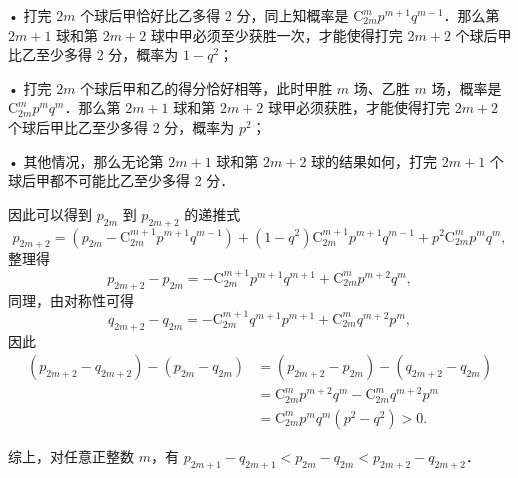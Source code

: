 \begin{solutions}
• 打完 $2m$ 个球后甲恰好比乙多得 2 分，同上知概率是 $\mathrm{C}_{2m}^mp^{m+1}q^{m-1}$．那么第 $2m+1$ 球和第 $2m+2$ 球中甲必须至少获胜一次，才能使得打完 $2m+2$ 个球后甲比乙至少多得 2 分，概率为 $1-q^2$；

• 打完 $2m$ 个球后甲和乙的得分恰好相等，此时甲胜 $m$ 场、乙胜 $m$ 场，概率是 $\mathrm{C}_{2m}^mp^mq^m$．那么第 $2m+1$ 球和第 $2m+2$ 球甲必须获胜，才能使得打完 $2m+2$ 个球后甲比乙至少多得 2 分，概率为 $p^2$；

• 其他情况，那么无论第 $2m+1$ 球和第 $2m+2$ 球的结果如何，打完 $2m+1$ 个球后甲都不可能比乙至少多得 2 分．

因此可以得到 $p_{2m}$ 到 $p_{2m+2}$ 的递推式
$$
p_{2m+2}=\left(p_{2m}-\mathrm{C}_{2m}^{m+1}p^{m+1}q^{m-1}\right)+(1-q^2)\mathrm{C}_{2m}^{m+1}p^{m+1}q^{m-1}+p^2\mathrm{C}_{2m}^mp^mq^m,
$$
整理得
$$
p_{2m+2}-p_{2m}=-\mathrm{C}_{2m}^{m+1}p^{m+1}q^{m+1}+\mathrm{C}_{2m}^mp^{m+2}q^m,
$$
同理，由对称性可得
$$
q_{2m+2}-q_{2m}=-\mathrm{C}_{2m}^{m+1}q^{m+1}p^{m+1}+\mathrm{C}_{2m}^mq^{m+2}p^m,
$$
因此
\begin{align*}
(p_{2m+2}-q_{2m+2})-(p_{2m}-q_{2m})&=(p_{2m+2}-p_{2m})-(q_{2m+2}-q_{2m})\\
&=\mathrm{C}_{2m}^mp^{m+2}q^m-\mathrm{C}_{2m}^mq^{m+2}p^m\\
&=\mathrm{C}_{2m}^mp^mq^m(p^2-q^2)>0.
\end{align*}

综上，对任意正整数 $m$，有 $p_{2m+1}-q_{2m+1}<p_{2m}-q_{2m}<p_{2m+2}-q_{2m+2}$．
\end{solutions}